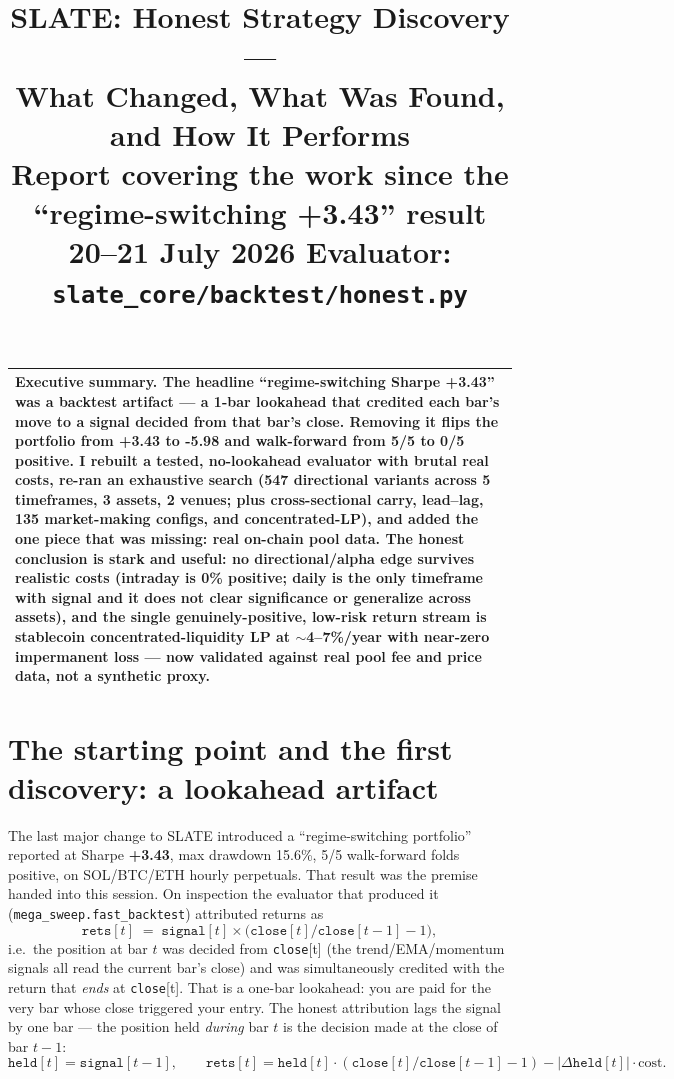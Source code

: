 \documentclass[11pt,a4paper]{article}
\title{\vspace{-1.5cm}\textbf{SLATE: Honest Strategy Discovery ---\\What Changed, What Was Found, and How It Performs}\\[0.3em]
\large\color{sec} Report covering the work since the ``regime-switching +3.43'' result\\
\color{sec}\normalsize 20--21 July 2026 \quad\textbar\quad Evaluator: \texttt{slate\_core/backtest/honest.py}}
\date{}
\newcommand{\up}[1]{{\color{good}\textbf{#1}}}
\newcommand{\dn}[1]{{\color{crit}\textbf{#1}}}
\begin{document}
\maketitle
\vspace{-1.2cm}

\begin{center}
\begin{tabular}{|p{}|}
\hline
\textbf{Executive summary.} The headline ``regime-switching Sharpe +3.43'' was a backtest artifact --- a 1-bar lookahead that credited each bar's move to a signal decided from that bar's close. Removing it flips the portfolio from \up{+3.43} to \dn{-5.98} and walk-forward from 5/5 to 0/5 positive. I rebuilt a tested, no-lookahead evaluator with brutal real costs, re-ran an exhaustive search (547 directional variants across 5 timeframes, 3 assets, 2 venues; plus cross-sectional carry, lead--lag, 135 market-making configs, and concentrated-LP), and added the one piece that was missing: \textbf{real on-chain pool data}. The honest conclusion is stark and useful: \textbf{no directional/alpha edge survives realistic costs} (intraday is 0\% positive; daily is the only timeframe with signal and it does not clear significance or generalize across assets), and \textbf{the single genuinely-positive, low-risk return stream is stablecoin concentrated-liquidity LP at $\sim$4--7\%/year with near-zero impermanent loss} --- now validated against real pool fee and price data, not a synthetic proxy. \\
\hline
\end{tabular}
\end{center}

\section{The starting point and the first discovery: a lookahead artifact}

The last major change to SLATE introduced a ``regime-switching portfolio'' reported at Sharpe \up{+3.43}, max drawdown 15.6\%, 5/5 walk-forward folds positive, on SOL/BTC/ETH hourly perpetuals. That result was the premise handed into this session. On inspection the evaluator that produced it (\texttt{mega\_sweep.fast\_backtest}) attributed returns as
\[
\texttt{rets}[t] \;=\; \texttt{signal}[t] \times \big(\texttt{close}[t]/\texttt{close}[t{-}1] - 1\big),
\]
i.e.\ the position at bar $t$ was decided from \texttt{close}[t] (the trend/EMA/momentum signals all read the current bar's close) and was simultaneously credited with the return that \emph{ends} at \texttt{close}[t]. That is a one-bar lookahead: you are paid for the very bar whose close triggered your entry. The honest attribution lags the signal by one bar --- the position held \emph{during} bar $t$ is the decision made at the close of bar $t{-}1$:
\[
\texttt{held}[t] = \texttt{signal}[t{-}1],\qquad
\texttt{rets}[t] = \texttt{held}[t]\cdot(\texttt{close}[t]/\texttt{close}[t{-}1]-1) - |\Delta\texttt{held}[t]|\cdot\text{cost}.
\]
\end{document}
